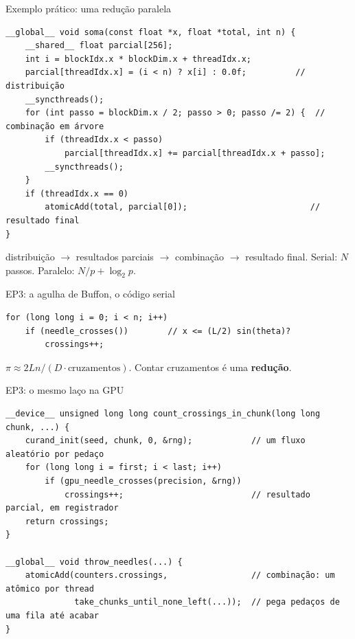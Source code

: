 \documentclass[aspectratio=169,11pt]{beamer}
\begin{document}
\begin{frame}[fragile]{Exemplo prático: uma redução paralela}
  \begin{lstlisting}
__global__ void soma(const float *x, float *total, int n) {
    __shared__ float parcial[256];
    int i = blockIdx.x * blockDim.x + threadIdx.x;
    parcial[threadIdx.x] = (i < n) ? x[i] : 0.0f;          // distribuição
    __syncthreads();
    for (int passo = blockDim.x / 2; passo > 0; passo /= 2) {  // combinação em árvore
        if (threadIdx.x < passo)
            parcial[threadIdx.x] += parcial[threadIdx.x + passo];
        __syncthreads();
    }
    if (threadIdx.x == 0)
        atomicAdd(total, parcial[0]);                         // resultado final
}
  \end{lstlisting}
  \small distribuição $\to$ resultados parciais $\to$ combinação $\to$ resultado final. Serial: $N$ passos. Paralelo: $N/p + \log_2 p$.
\end{frame}


\begin{frame}[fragile]{EP3: a agulha de Buffon, o código serial}
  \begin{lstlisting}
for (long long i = 0; i < n; i++)
    if (needle_crosses())        // x <= (L/2) sin(theta)?
        crossings++;
  \end{lstlisting}
  \vfill
  $\pi \approx 2 L n / (D \cdot \text{cruzamentos})$. Contar cruzamentos é uma \textbf{redução}.
\end{frame}

\begin{frame}[fragile]{EP3: o mesmo laço na GPU}
  \begin{lstlisting}
__device__ unsigned long long count_crossings_in_chunk(long long chunk, ...) {
    curand_init(seed, chunk, 0, &rng);            // um fluxo aleatório por pedaço
    for (long long i = first; i < last; i++)
        if (gpu_needle_crosses(precision, &rng))
            crossings++;                          // resultado parcial, em registrador
    return crossings;
}

__global__ void throw_needles(...) {
    atomicAdd(counters.crossings,                 // combinação: um atômico por thread
              take_chunks_until_none_left(...));  // pega pedaços de uma fila até acabar
}
  \end{lstlisting}
\end{frame}
\end{document}
